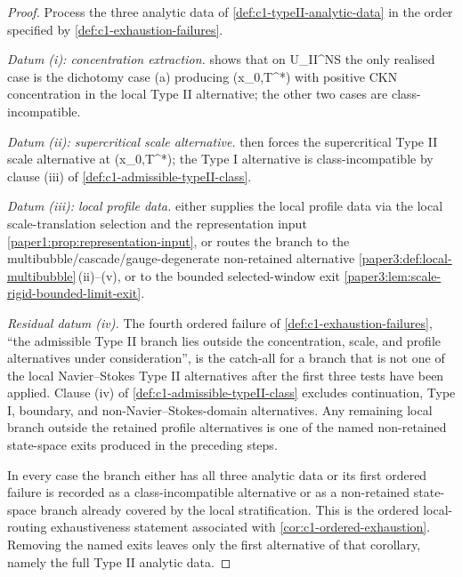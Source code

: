 \documentclass[11pt]{amsart}
\def\({}%
\def\){}%
\def\mathrm#1{#1}%
\theoremstyle{plain}
\theoremstyle{definition}
\theoremstyle{remark}
\begin{document}
\begin{proof}
Process the three analytic data of \cref{def:c1-typeII-analytic-data} in the
order specified by \cref{def:c1-exhaustion-failures}.

\emph{Datum (i): concentration extraction.}
 shows that on
\(\mathcal U_{\mathrm{II}}^{NS}\) the only realised case is the dichotomy
case \textup{(a)} producing \((x_0,T^*)\) with positive CKN concentration in
the local Type II alternative; the other two cases are class-incompatible.

\emph{Datum (ii): supercritical scale alternative.}
 then forces the
supercritical Type II scale alternative at \((x_0,T^*)\); the Type I
alternative is class-incompatible by clause \textup{(iii)} of
\cref{def:c1-admissible-typeII-class}.

\emph{Datum (iii): local profile data.}
 either supplies the local
profile data via the local scale-translation selection and the representation
input \cref{paper1:prop:representation-input}, or routes the branch to the
multibubble/cascade/gauge-degenerate non-retained alternative
\cref{paper3:def:local-multibubble}\,\textup{(ii)}--\textup{(v)}, or to the
bounded selected-window exit
\cref{paper3:lem:scale-rigid-bounded-limit-exit}.

\emph{Residual datum (iv).}
The fourth ordered failure of \cref{def:c1-exhaustion-failures}, ``the
admissible Type II branch lies outside the concentration, scale, and
profile alternatives under consideration'', is the catch-all for a branch that
is not one of the local Navier--Stokes Type II alternatives after the first
three tests have been applied.  Clause \textup{(iv)} of
\cref{def:c1-admissible-typeII-class} excludes continuation, Type I, boundary,
and non-Navier--Stokes-domain alternatives.  Any remaining local branch outside
the retained profile alternatives is one of the named non-retained state-space
exits produced in the preceding steps.

In every case the branch either has all three analytic data or its first
ordered failure is recorded as a class-incompatible alternative or as a
non-retained state-space branch already covered by the local stratification.
This is the ordered local-routing exhaustiveness statement associated with
\cref{cor:c1-ordered-exhaustion}.  Removing the named exits leaves only the
first alternative of that corollary, namely the full Type II analytic data.
\end{proof}
\end{document}
